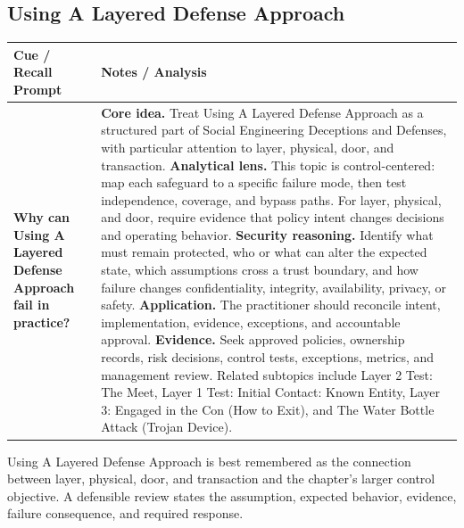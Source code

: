 \documentclass[11pt]{article}
\newcommand{\CornellHeader}{%
\rowcolor{Navy}\color{white}\bfseries Cue / Recall Prompt & \color{white}\bfseries Notes / Analysis\\\hline}
\newcommand{\CornellRow}[2]{%
\cellcolor{CueGray}\RaggedRight\textbf{#1} & \RaggedRight #2\\\hline}
\begin{document}
\subsection*{Using A Layered Defense Approach}
\begin{longtable}{>{\RaggedRight\arraybackslash}p{}|>{\RaggedRight\arraybackslash}p{}}
\CornellHeader
\CornellRow{Why can Using A Layered Defense Approach fail in practice?}{\textbf{Core idea.} Treat Using A Layered Defense Approach as a structured part of Social Engineering Deceptions and Defenses, with particular attention to layer, physical, door, and transaction. \textbf{Analytical lens.} This topic is control-centered: map each safeguard to a specific failure mode, then test independence, coverage, and bypass paths. For layer, physical, and door, require evidence that policy intent changes decisions and operating behavior. \textbf{Security reasoning.} Identify what must remain protected, who or what can alter the expected state, which assumptions cross a trust boundary, and how failure changes confidentiality, integrity, availability, privacy, or safety. \textbf{Application.} The practitioner should reconcile intent, implementation, evidence, exceptions, and accountable approval. \textbf{Evidence.} Seek approved policies, ownership records, risk decisions, control tests, exceptions, metrics, and management review. Related subtopics include Layer 2 Test: The Meet, Layer 1 Test: Initial Contact: Known Entity, Layer 3: Engaged in the Con (How to Exit), and The Water Bottle Attack (Trojan Device).}
\end{longtable}
\begin{topicsummary}
Using A Layered Defense Approach is best remembered as the connection between layer, physical, door, and transaction and the chapter's larger control objective. A defensible review states the assumption, expected behavior, evidence, failure consequence, and required response.
\end{topicsummary}
\end{document}
